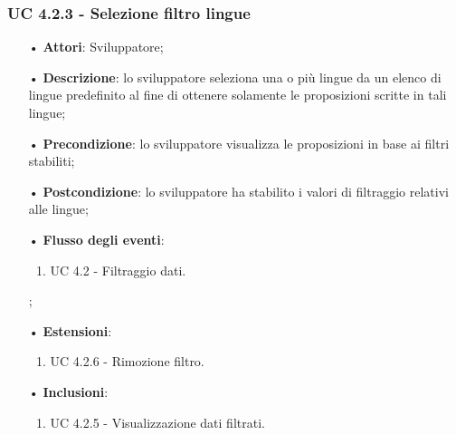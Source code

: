 \subsubsection{UC 4.2.3 -  Selezione filtro lingue}
\begin{itemize}
\item[•]\textbf{Attori}: Sviluppatore;
\item[•]\textbf{Descrizione}: lo sviluppatore seleziona una o più lingue da un elenco di lingue predefinito al fine di ottenere solamente le proposizioni scritte in tali lingue;
\item[•]\textbf{Precondizione}: lo sviluppatore visualizza le proposizioni in base ai filtri stabiliti;
\item[•]\textbf{Postcondizione}: lo sviluppatore ha stabilito i valori di filtraggio relativi alle lingue;
\item[•]\textbf{Flusso degli eventi}: 	
\begin{enumerate}
	\item UC 4.2 - Filtraggio dati.
\end{enumerate};
\item[•]\textbf{Estensioni}: 
\begin{enumerate}
	\item UC 4.2.6 - Rimozione filtro.
\end{enumerate}
\item[•]\textbf{Inclusioni}:
\begin{enumerate}
\item UC 4.2.5 - Visualizzazione dati filtrati.
\end{enumerate}
\end{itemize}

